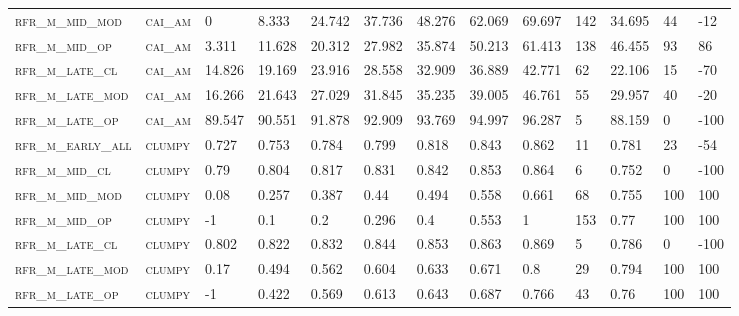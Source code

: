\begin{landscape}
\begin{center}
\begin{footnotesize}
\begin{longtable}{lllllllllllll}
\textsc{rfr\_m\_mid\_mod  } & \textsc{cai\_am   }   & 0       & 8.333   & 24.742   & 37.736   & 48.276   & 62.069   & 69.697   & 142    & 34.695        & 44            & -12      \\
\textsc{rfr\_m\_mid\_op   } & \textsc{cai\_am   }   & 3.311   & 11.628  & 20.312   & 27.982   & 35.874   & 50.213   & 61.413   & 138    & 46.455        & 93            & 86       \\
\textsc{rfr\_m\_late\_cl  } & \textsc{cai\_am   }   & 14.826  & 19.169  & 23.916   & 28.558   & 32.909   & 36.889   & 42.771   & 62     & 22.106        & 15            & -70      \\
\textsc{rfr\_m\_late\_mod } & \textsc{cai\_am   }   & 16.266  & 21.643  & 27.029   & 31.845   & 35.235   & 39.005   & 46.761   & 55     & 29.957        & 40            & -20      \\
\textsc{rfr\_m\_late\_op  } & \textsc{cai\_am   }   & 89.547  & 90.551  & 91.878   & 92.909   & 93.769   & 94.997   & 96.287   & 5      & 88.159        & 0             & -100     \\
\textsc{rfr\_m\_early\_all} & \textsc{clumpy    }   & 0.727   & 0.753   & 0.784    & 0.799    & 0.818    & 0.843    & 0.862    & 11     & 0.781         & 23            & -54      \\
\textsc{rfr\_m\_mid\_cl   } & \textsc{clumpy    }   & 0.79    & 0.804   & 0.817    & 0.831    & 0.842    & 0.853    & 0.864    & 6      & 0.752         & 0             & -100     \\
\textsc{rfr\_m\_mid\_mod  } & \textsc{clumpy    }   & 0.08    & 0.257   & 0.387    & 0.44     & 0.494    & 0.558    & 0.661    & 68     & 0.755         & 100           & 100      \\
\textsc{rfr\_m\_mid\_op   } & \textsc{clumpy    }   & -1      & 0.1     & 0.2      & 0.296    & 0.4      & 0.553    & 1        & 153    & 0.77          & 100           & 100      \\
\textsc{rfr\_m\_late\_cl  } & \textsc{clumpy    }   & 0.802   & 0.822   & 0.832    & 0.844    & 0.853    & 0.863    & 0.869    & 5      & 0.786         & 0             & -100     \\
\textsc{rfr\_m\_late\_mod } & \textsc{clumpy    }   & 0.17    & 0.494   & 0.562    & 0.604    & 0.633    & 0.671    & 0.8      & 29     & 0.794         & 100           & 100      \\
\textsc{rfr\_m\_late\_op  } & \textsc{clumpy    }   & -1      & 0.422   & 0.569    & 0.613    & 0.643    & 0.687    & 0.766    & 43     & 0.76          & 100           & 100      \\

\end{longtable}
\end{footnotesize}
\end{center}
\end{landscape}

